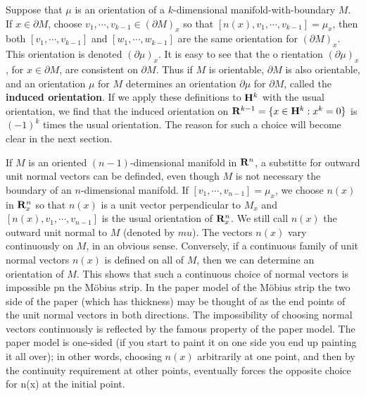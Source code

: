 Suppose that $\mu$ is an orientation of a $k$-dimensional manifold-with-boundary $M$. If $x\in\partial M$,
choose $v_1,\cdots,v_{k-1}\in(\partial M)_x$ so that $[n(x), v_1, \cdots, v_{k-1}]=\mu_x$, then both 
$[v_1,\cdots,v_{k-1}]$ and $[w_1,\cdots,w_{k-1}]$ are the same orientation for $(\partial M)_x$. This 
orientation is denoted $(\partial\mu)_x$. It is easy to see that the o  rientation $(\partial\mu)_x$, for 
$x\in\partial M$, are consistent on $\partial M$. Thus if $M$ is orientable, $\partial M$ is also orientable,
and an orientation $\mu$ for $M$ determines an orientation $\partial\mu$ for $\partial M$, called the 
\textbf{induced orientation}. If we apply these definitions to $\mathbf{H}^k$ with the usual orientation, 
we find that the induced orientation on $\mathbf{R}^{k-1}=\{x\in\mathbf{H}^k:x^k=0\}$ is $(-1)^k$ times the usual orientation.
The reason for such a choice will become clear in the next section.

If $M$ is an oriented $(n-1)$-dimensional manifold in $\mathbf{R}^n$, a substitte for outward unit normal 
vectors can be definded, even though $M$ is not necessary the boundary of an $n$-dimensional manifold.
If $[v_1,\cdots,v_{n-1}]=\mu_x$, we choose $n(x)$ in $\mathbf{R}^n_x$ so that $n(x)$ is a unit vector perpendicular 
to $M_x$ and $[n(x), v_1,\cdots,v_{n-1}]$ is the usual orientation of $\mathbf{R}^n_x$. We still call $n(x)$ 
the outward unit normal to $M$ (denoted by $mu$). The vectors $n(x)$ vary continuously on $M$, in an 
obvious sense. Conversely, if a continuous family of unit normal vectors $n(x)$ is defined on all of $M$, 
then we can determine an orientation of $M$. This shows that such a continuous choice of normal vectors is 
impossible pn the M\"obius strip. In the paper model of the M\"obius strip the two side of the paper (which 
has thickness) may be thought of as the end points of the unit normal vectors in both directions.
The impossibility of choosing normal vectors continuously is reflected by the
famous property of the paper model. The paper model is one-sided (if you start to paint it on one 
side you end up painting it all over); in other words, choosing $n(x)$ arbitrarily
at one point, and then by the continuity requirement at other points, eventually forces the 
opposite choice for n(x) at the initial point.


